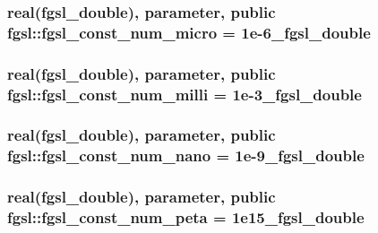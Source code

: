 \hypertarget{classfgsl_aa7d0f5804ffc72dc0ecddbee234cd51d}{
\subsubsection[{fgsl\-\_\-const\-\_\-num\-\_\-micro}]{\setlength{\rightskip}{0pt plus 5cm}real({\bf fgsl\-\_\-double}), parameter, public fgsl\-::fgsl\-\_\-const\-\_\-num\-\_\-micro = 1e-\/6\-\_\-fgsl\-\_\-double}}\label{classfgsl_aa7d0f5804ffc72dc0ecddbee234cd51d}
\hypertarget{classfgsl_a3fb5efe0ae67e7937ba05e8f184e2d35}{
\subsubsection[{fgsl\-\_\-const\-\_\-num\-\_\-milli}]{\setlength{\rightskip}{0pt plus 5cm}real({\bf fgsl\-\_\-double}), parameter, public fgsl\-::fgsl\-\_\-const\-\_\-num\-\_\-milli = 1e-\/3\-\_\-fgsl\-\_\-double}}\label{classfgsl_a3fb5efe0ae67e7937ba05e8f184e2d35}
\hypertarget{classfgsl_a18d57365a461c2adc8f4e0ddb4c690d6}{
\subsubsection[{fgsl\-\_\-const\-\_\-num\-\_\-nano}]{\setlength{\rightskip}{0pt plus 5cm}real({\bf fgsl\-\_\-double}), parameter, public fgsl\-::fgsl\-\_\-const\-\_\-num\-\_\-nano = 1e-\/9\-\_\-fgsl\-\_\-double}}\label{classfgsl_a18d57365a461c2adc8f4e0ddb4c690d6}
\hypertarget{classfgsl_aa124eb86407291ed14158b0802d02029}{
\subsubsection[{fgsl\-\_\-const\-\_\-num\-\_\-peta}]{\setlength{\rightskip}{0pt plus 5cm}real({\bf fgsl\-\_\-double}), parameter, public fgsl\-::fgsl\-\_\-const\-\_\-num\-\_\-peta = 1e15\-\_\-fgsl\-\_\-double}}\label{classfgsl_aa124eb86407291ed14158b0802d02029}
